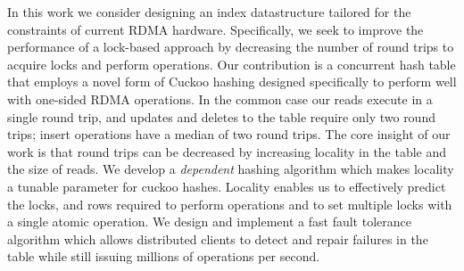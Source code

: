 
In this work we consider designing an index datastructure
tailored for the constraints of current RDMA hardware.
Specifically, we seek to improve the performance of a
lock-based approach by decreasing the number of round trips
to acquire locks and perform operations. Our contribution is
a concurrent hash table that employs a novel form of Cuckoo
hashing designed specifically to perform well with one-sided
RDMA operations.  In the common case our reads execute in a
single round trip, and updates and deletes to the table
require only two round trips; insert operations have a
median of two round trips.  The core insight of our work is
that round trips can be decreased by increasing locality in
the table and the size of reads. We develop a
\emph{dependent} hashing algorithm which makes locality a
tunable parameter for cuckoo hashes.  Locality enables us to
effectively predict the locks, and rows required to perform
operations and to set multiple locks with a single atomic
operation. We design and implement a fast fault tolerance
algorithm which allows distributed clients to detect and
repair failures in the table while still issuing millions of
operations per second.


